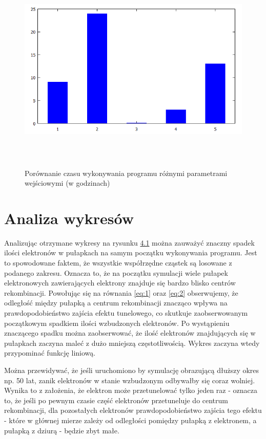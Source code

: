 \begin{figure}[H]
\centering
\includegraphics[width=17cm, height = 10cm]{czas}
\caption{Porównanie czasu wykonywania programu różnymi parametrami wejściowymi (w godzinach)}
\label{rys:2}
\end{figure}



\section{Analiza wykresów}
Analizując otrzymane wykresy  na rysunku \hyperref[rys:1]{4.1} można zauważyć znaczny spadek ilości elektronów w pułapkach na samym początku wykonywania programu. Jest to spowodowane faktem, że wszystkie współrzędne cząstek są losowane z podanego zakresu. Oznacza to, że na początku symulacji wiele pułapek elektronowych zawierających elektrony znajduje się bardzo blisko centrów rekombinacji. Powołując się na równania \ref{eq:1} oraz \ref{eq:2} obserwujemy, że odległość między pułapką a centrum rekombinacji znacząco wpływa na prawdopodobieństwo zajścia efektu tunelowego, co skutkuje zaobserwowanym początkowym spadkiem ilości wzbudzonych elektronów. Po wystąpieniu znaczącego spadku można zaobserwować, że ilość elektronów znajdujących się w pułapkach zaczyna maleć z dużo mniejszą częstotliwością. Wykres zaczyna wtedy przypominać funkcję liniową. 

Można przewidywać, że jeśli uruchomiono by symulację obrazującą dłuższy okres np. 50 lat, zanik elektronów w stanie wzbudzonym odbywałby się coraz wolniej. Wynika to z założenia, że elektron może przetunelować tylko jeden raz - oznacza to, że jeśli po pewnym czasie część elektronów przetuneluje do centrum rekombinacji, dla pozostałych elektronów prawdopodobieństwo zajścia tego efektu - które w głównej mierze zależy od odległości pomiędzy pułapką z elektronem, a pułapką z dziurą - będzie zbyt małe.

